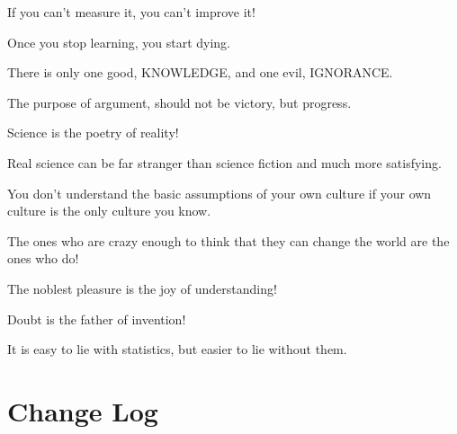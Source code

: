 \documentclass[12pt,a4paper,twoside,openright]{report}
\theoremstyle{definition}
\theoremstyle{itexmp}
\numberwithin{equation}{section}
\begin{document}
 	\begin{fquote}If you can't measure it, you can't improve it!
 	\end{fquote}
 	
 	\begin{fquote}Once you stop learning, you start dying.
 	\end{fquote}
 	
 	\begin{fquote}[Socrates]There is only one good, KNOWLEDGE, and one evil, IGNORANCE.
 	\end{fquote}
 	
 	\begin{fquote}[?]The purpose of argument, should not be victory, but progress.
 	\end{fquote}
 	
 	\begin{fquote}Science is the poetry of reality!
 	\end{fquote}
 	
 	\begin{fquote}Real science can be far stranger than science fiction and much more satisfying.
 	\end{fquote}
 	
 	\begin{fquote} You don't understand the basic assumptions of your own culture if your own culture is the only culture you know.
 	\end{fquote}
 	
 	\begin{fquote}The ones who are crazy enough to think that they can change the world are the ones who do!
 	\end{fquote}
 	
 	\begin{fquote}The noblest pleasure is the joy of understanding!
 	\end{fquote}
 	
 	\begin{fquote}Doubt is the father of invention!
 	\end{fquote}
 	
 	\begin{fquote}It is easy to lie with statistics, but easier to lie without them.
 	\end{fquote}

\chapter{Change Log}
\end{document}
